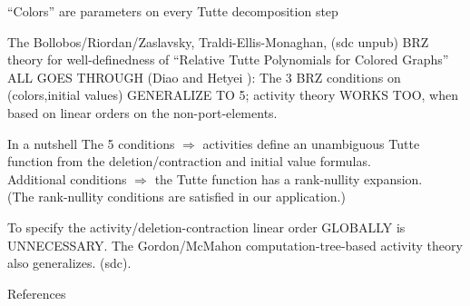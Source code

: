 \documentclass{beamer}
\newcommand{\Remph}[1]{{\color{red}#1}}
\begin{document}
\begin{frame}{``Colors'' are parameters on every Tutte decomposition step}

The Bollobos/Riordan/Zaslavsky\cite{BollobasRiordanTuttePolyColored,MR93a:05047}, Traldi-Ellis-Monaghan\cite{Ellis-Monaghan-Traldi}, (sdc unpub)
BRZ theory for well-definedness
of ``Relative Tutte Polynomials for Colored Graphs'' ALL GOES THROUGH 
(Diao and Hetyei \cite{RelTuttePoly}):
The 3 BRZ conditions on (colors,initial values) GENERALIZE TO 5;
activity theory WORKS TOO, when
based on linear orders on the non-port-elements.

\begin{block}{In a nutshell}
The 5 conditions $\Longrightarrow$ activities define an 
unambiguous Tutte function 
from the deletion/contraction and initial value formulas.\\

Additional conditions $\Longrightarrow$ the Tutte function has a rank-nullity
expansion.\\

\Remph{
(The rank-nullity conditions are satisfied in our application.)}
\end{block}

\begin{block}{To specify the activity/deletion-contraction linear 
order GLOBALLY is 
UNNECESSARY.}
The Gordon/McMahon computation-tree-based 
activity theory also generalizes. (sdc).
\end{block}
\end{frame}


\begin{frame}[allowframebreaks]{References}

{}
\end{frame}


\end{document}
